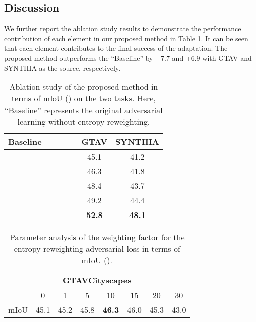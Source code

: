 \documentclass[sigconf]{acmart}
\begin{document}
\subsection{Discussion}
\par We further report the ablation study results to demonstrate the performance contribution of each element in our proposed method in Table \ref{tab:3}. It can be seen that each element contributes to the final success of the adaptation. The proposed method outperforms the “Baseline” by +7.7 and +6.9 with GTAV and SYNTHIA as the source, respectively.

\begin{table}[!t]
        \caption{Ablation study of the proposed method in terms of mIoU () on the two tasks. Here, “Baseline” represents the original adversarial learning without entropy reweighting.}
        \centering
        \setlength\tabcolsep{3.4pt}
        \begin{tabular}{ccccc|cc}
        \toprule
        Baseline &    &  &  &  & GTAV&	SYNTHIA \\
        \hline
         &  & & & & 45.1&	41.2\\
          &  &  & & & 46.3&	41.8\\
         &   &  & & &	48.4&	43.7\\
 &  &  &  &   &	49.2&	44.4\\
         & & & & &	\textbf{52.8}&	\textbf{48.1}\\
        \toprule
        \end{tabular}
        \label{tab:3}
\end{table}

\begin{table}
    \caption{Parameter analysis of the weighting factor  for the entropy reweighting adversarial loss in terms of mIoU ().}
    \centering
    \begin{tabular}{c c c c c c c c}
    \toprule
    \multicolumn{8}{c}{GTAVCityscapes}\\
    \hline
     & 0 & 1 & 5 & 10& 15 & 20 & 30  \\
    \hline
    mIoU & 45.1 & 45.2 & 45.8 & \textbf{46.3} & 46.0 & 45.3 & 43.0 \\  
    \toprule
    \end{tabular}
    \label{tab:4}
\end{table}
\end{document}

